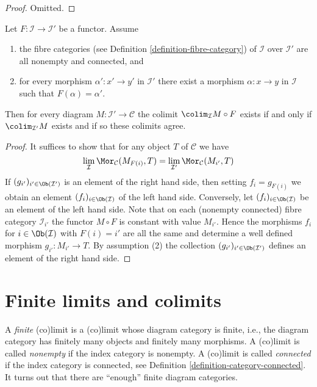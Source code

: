 \begin{proof}
Omitted.
\end{proof}

\begin{lemma}
\label{lemma-colimit-constant-connected-fibers}
Let $F : \mathcal{I} \to \mathcal{I}'$ be a functor.
Assume
\begin{enumerate}
\item the fibre categories (see
Definition \ref{definition-fibre-category})
of $\mathcal{I}$ over $\mathcal{I}'$ are all nonempty and connected, and
\item for every morphism $\alpha' : x' \to y'$ in $\mathcal{I}'$ there
exist a morphism $\alpha : x \to y$ in $\mathcal{I}$ such that
$F(\alpha) = \alpha'$.
\end{enumerate}
Then for every diagram $M : \mathcal{I}' \to \mathcal{C}$
the colimit $\colim_\mathcal{I} M \circ F$ exists if and only
if $\colim_{\mathcal{I}'} M$ exists and if so these colimits
agree.
\end{lemma}

\begin{proof}
It suffices to show that for any object $T$ of $\mathcal{C}$ we have
$$
\lim_\mathcal{I} \Mor_\mathcal{C}(M_{F(i)}, T)
=
\lim_{\mathcal{I}'} \Mor_\mathcal{C}(M_{i'}, T)
$$
If $(g_{i'})_{i' \in \Ob(\mathcal{I}')}$ is an element of
the right hand side, then setting $f_i = g_{F(i)}$ we obtain an
element $(f_i)_{i \in \Ob(\mathcal{I})}$ of the left hand side.
Conversely, let $(f_i)_{i \in \Ob(\mathcal{I})}$ be an element of the
left hand side. Note that on each (nonempty connected)
fibre category $\mathcal{I}_{i'}$ the functor $M \circ F$
is constant with value $M_{i'}$. Hence the morphisms
$f_i$ for $i \in \Ob(\mathcal{I})$ with $F(i) = i'$
are all the same and determine a well defined morphism
$g_{i'} : M_{i'} \to T$. By assumption (2) the collection
$(g_{i'})_{i' \in \Ob(\mathcal{I}')}$ defines an element
of the right hand side.
\end{proof}







\section{Finite limits and colimits}
\label{section-finite-limits}

\noindent
A {\it finite} (co)limit is a (co)limit whose diagram category is finite,
i.e., the diagram category has finitely many objects and finitely many
morphisms. A (co)limit is called {\it nonempty} if the index category is
nonempty. A (co)limit is called {\it connected} if the index category is
connected, see
Definition \ref{definition-category-connected}.
It turns out that there are ``enough'' finite diagram categories.

